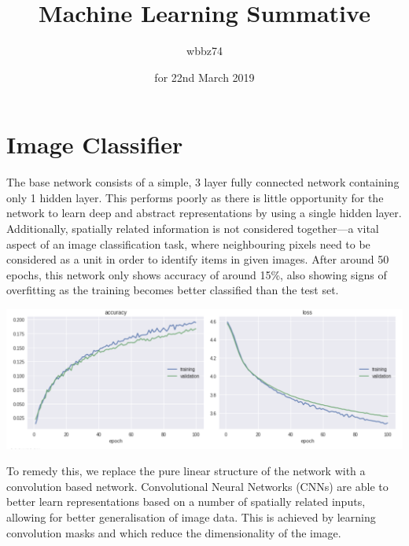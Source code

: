 \documentclass[11pt]{article}
\begin{document}
\title{\textbf{Machine Learning Summative}}
\date{for 22nd March 2019}
\author{wbbz74}
\maketitle 

\section{Image Classifier}


The base network consists of a simple, 3 layer fully connected network containing only 1 hidden layer. This performs poorly as there is little opportunity for the network to learn deep and abstract representations by using a single hidden layer. Additionally, spatially related information is not considered together---a vital aspect of an image classification task, where neighbouring pixels need to be considered as a unit in order to identify items in given images. After around 50 epochs, this network only shows accuracy of around 15\%, also showing signs of overfitting as the training becomes better classified than the test set.

    \begin{center}
        \begin{minipage}{0.75\linewidth}
            \includegraphics[width=\linewidth]{accuracy0}
        \end{minipage}%
    \end{center}


To remedy this, we replace the pure linear structure of the network with a convolution based network. Convolutional Neural Networks (CNNs) are able to better learn representations based on a number of spatially related inputs, allowing for better generalisation of image data. This is achieved by learning convolution masks and which reduce the dimensionality of the image. 
\end{document}
